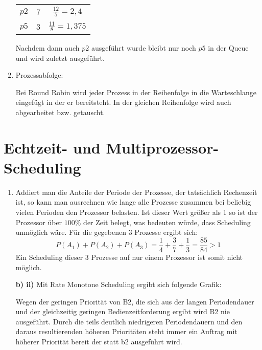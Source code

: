 \documentclass[a4paper,11pt,ngerman]{scrartcl}
\begin{document}
\begin{enumerate}[\bf a)]
\begin{tabular}{c|c|c}
            $p2$ & 7 & $\frac{12}{5} = 2,4$\\
            $p5$ & 3 & $\frac{11}{8} = 1,375$
        \end{tabular}

        Nachdem dann auch $p2$ ausgeführt wurde bleibt nur noch $p5$ in der
        Queue und wird zuletzt ausgeführt.

    \item Prozessabfolge:\\
        \begin{figure}[h]
            \scalebox{0.5}{}
        \end{figure}

        Bei Round Robin wird jeder Prozess in der Reihenfolge in die Warteschlange
        eingefügt in der er bereitsteht. In der gleichen Reihenfolge wird auch
        abgearbeitet bzw. getauscht.
\end{enumerate}

\section{Echtzeit- und Multiprozessor-Scheduling}

\begin{enumerate}[\bf a)]
    \item Addiert man die Anteile der Periode der Prozesse, der tatsächlich Rechenzeit ist, so kann man ausrechnen wie lange alle Prozesse zusammen bei beliebig vielen Perioden den Prozessor belasten. Ist dieser Wert größer als 1 so ist der Prozessor über $100\%$ der Zeit belegt, was bedeuten würde, dass Scheduling unmöglich wäre. Für die gegebenen 3 Prozesse ergibt sich:
    \begin{displaymath}
        P(A_1) + P(A_2) + P(A_3) = \frac{1}{4} + \frac{3}{7} + \frac{1}{3} = \frac{85}{84} > 1
    \end{displaymath}
    Ein Scheduling dieser 3 Prozesse auf nur einem Prozessor ist somit nicht möglich. 
    
    \item[\textbf{b) ii)}] Mit Rate Monotone Scheduling ergibt sich folgende Grafik:
    \begin{center}
        \scalebox{0.4}{}
    \end{center}
    Wegen der geringen Priorität von B2, die sich aus der langen Periodendauer und der gleichzeitig geringen Bedienzeitforderung ergibt wird B2 nie ausgeführt. Durch die teils deutlich niedrigeren Periodendauern und den daraus resultierenden höheren Prioritäten steht immer ein Auftrag mit höherer Priorität bereit der statt b2 ausgeführt wird.
\end{enumerate}
\end{document}
